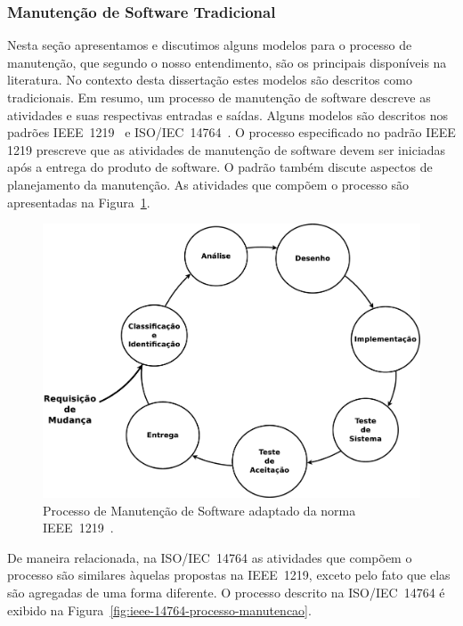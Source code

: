 \subsubsection{Manutenção de Software Tradicional}\label{subsec:manutenção_de_software_tradicional}

Nesta seção apresentamos e discutimos alguns modelos para o processo de
manutenção, que segundo o nosso entendimento, são os principais disponíveis na
literatura. No contexto desta dissertação estes modelos são descritos como
tradicionais. Em resumo, um processo de manutenção de software descreve as
atividades e suas respectivas entradas e saídas. Alguns modelos são descritos
nos padrões IEEE~1219~\cite{IEEE1999-Std1219} e
ISO/IEC~14764~\cite{institute2006norma}. O processo especificado no padrão IEEE
1219 prescreve que as atividades de manutenção de software devem ser iniciadas
após a entrega do produto de software. O padrão também discute aspectos de
planejamento da manutenção. As atividades que compõem o processo são
apresentadas na Figura~\ref{fig:ieee-1219-processo-man-software}.

\begin{figure}[htpb] \centering
    \includegraphics[width=0.9\linewidth]
    {./chapter-manutencao-software-visao-geral/img/ieee_1219_98_processo_manutencao.eps}
	\caption{Processo de Manutenção de
		Software adaptado da norma IEEE~1219~\cite{IEEE1999-Std1219}.}\label{fig:ieee-1219-processo-man-software}
\end{figure}

De maneira relacionada, na ISO/IEC~14764 as atividades que compõem o processo
são similares àquelas propostas na IEEE~1219, exceto pelo fato que elas são
agregadas de uma forma diferente. O processo descrito na ISO/IEC~14764 é
exibido na Figura~\ref{fig:ieee-14764-processo-manutencao}.

